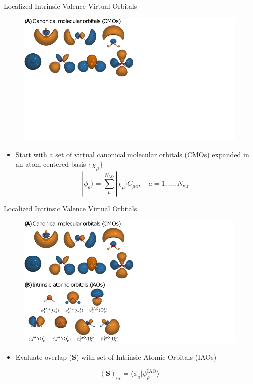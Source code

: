 \documentclass[t]{beamer}
\begin{document}
\begin{frame}{Localized Intrinsic Valence Virtual Orbitals}
\begin{figure}
\includegraphics[width=0.75\linewidth]{livvo_procedure_1.png}
\end{figure}
\begin{itemize}
\item Start with a set of virtual canonical molecular orbitals (CMOs) expanded in an atom-centered basis $\{\chi_{\mu}\}$
\begin{equation}
|\phi_a\rangle = \sum_{\mu}^{N_\mathrm{AO}} |\chi_{\mu} \rangle C_{\mu a}, \quad a = 1,\ldots,N_\mathrm{vir}
\end{equation}
\end{itemize}
\end{frame}

\begin{frame}{Localized Intrinsic Valence Virtual Orbitals}
\begin{figure}
\includegraphics[width=0.75\linewidth]{livvo_procedure_2.png}
\end{figure}
\begin{itemize}
\item Evaluate overlap ($\mathbf{S}$) with set of Intrinsic Atomic Orbitals (IAOs) 
\end{itemize}
\begin{equation}
(\mathbf{S})_{a\rho} = \langle \phi_a | \psi_{\rho}^\mathrm{IAO} \rangle
\end{equation}
\end{frame}
\end{document}
